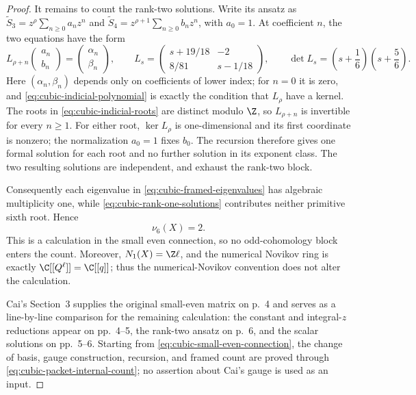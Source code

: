 \begin{proof}
It remains to count the rank-two solutions.  Write its ansatz as
\(\widetilde S_3=z^\rho\sum_{n\ge0}a_nz^n\) and
\(\widetilde S_4=z^{\rho+1}\sum_{n\ge0}b_nz^n\), with \(a_0=1\).
At coefficient \(n\), the two equations have the form
\[
 L_{\rho+n}\begin{pmatrix}a_n\\b_n\end{pmatrix}
 =\begin{pmatrix}\alpha_n\\\beta_n\end{pmatrix},
 \qquad
 L_s=
 \begin{pmatrix}
 s+19/18&-2\\
 8/81&s-1/18
 \end{pmatrix},
 \qquad
 \det L_s=\left(s+\frac16\right)\left(s+\frac56\right).
 \tag{4.9m}
 \label{eq:cubic-frobenius-recursion}
\]
Here \((\alpha_n,\beta_n)\) depends only on coefficients of lower index;
for \(n=0\) it is zero, and \eqref{eq:cubic-indicial-polynomial} is exactly
the condition that \(L_\rho\) have a kernel.  The roots in
\eqref{eq:cubic-indicial-roots} are distinct modulo \(\Z\), so
\(L_{\rho+n}\) is invertible for every \(n\ge1\).  For either root,
\(\ker L_\rho\) is one-dimensional and its first coordinate is nonzero;
the normalization \(a_0=1\) fixes \(b_0\).  The recursion therefore gives
one formal solution for each root and no further solution in its exponent
class.  The two resulting solutions are independent, and exhaust the
rank-two block.

Consequently each eigenvalue in \eqref{eq:cubic-framed-eigenvalues} has
algebraic multiplicity one, while
\eqref{eq:cubic-rank-one-solutions} contributes neither primitive sixth root.
Hence
\[
 \nu_6(X)=2.
 \tag{4.9n}
 \label{eq:cubic-packet-internal-count}
\]
This is a calculation in the small even connection, so no odd-cohomology block
enters the count.  Moreover, \(N_1(X)=\Z\ell\), and the numerical Novikov
ring is exactly \(\C[[Q^\ell]]=\C[[q]]\); thus the numerical-Novikov
convention does not alter the calculation.

Cai's Section~3 supplies the original small-even matrix on p.~4 and serves as
a line-by-line comparison for the remaining calculation: the constant and
integral-\(z\) reductions appear on pp.~4--5, the rank-two ansatz on p.~6,
and the scalar solutions on pp.~5--6.  Starting from
\eqref{eq:cubic-small-even-connection}, the change of basis, gauge
construction, recursion, and framed count are proved through
\eqref{eq:cubic-packet-internal-count}; no assertion about Cai's gauge is used
as an input.
\end{proof}

